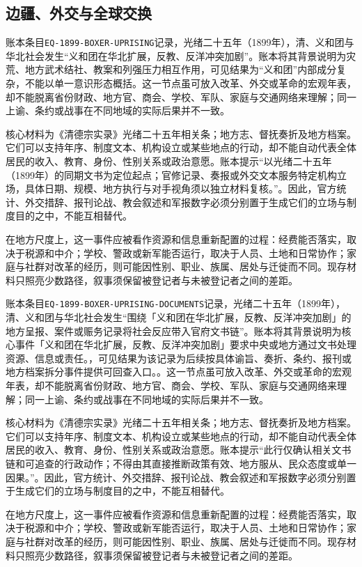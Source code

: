 \subsection{边疆、外交与全球交换}

账本条目\texttt{EQ-1899-BOXER-UPRISING}记录，光绪二十五年（1899年），清、义和团与华北社会发生“义和团在华北扩展，反教、反洋冲突加剧”。账本将其背景说明为灾荒、地方武术结社、教案和列强压力相互作用，可见结果为“义和团”内部成分复杂，不能以单一意识形态概括。这一节点虽可放入改革、外交或革命的宏观年表，却不能脱离省份财政、地方官、商会、学校、军队、家庭与交通网络来理解；同一上谕、条约或战事在不同地域的实际后果并不一致。

核心材料为《清德宗实录》光绪二十五年相关条；地方志、督抚奏折及地方档案。它们可以支持年序、制度文本、机构设立或某些地点的行动，却不能自动代表全体居民的收入、教育、身份、性别关系或政治意愿。账本提示“以光绪二十五年（1899年）的同期文书为定位起点；官修记录、奏报或外交文本服务特定机构立场，具体日期、规模、地方执行与对手视角须以独立材料复核。”。因此，官方统计、外交措辞、报刊论战、教会叙述和军报数字必须分别置于生成它们的立场与制度目的之中，不能互相替代。

在地方尺度上，这一事件应被看作资源和信息重新配置的过程：经费能否落实，取决于税源和中介；学校、警政或新军能否运行，取决于人员、土地和日常协作；家庭与社群对改革的经历，则可能因性别、职业、族属、居处与迁徙而不同。现存材料只照亮少数路径，叙事须保留被登记者与未被登记者之间的差距。

账本条目\texttt{EQ-1899-BOXER-UPRISING-DOCUMENTS}记录，光绪二十五年（1899年），清、义和团与华北社会发生“围绕「义和团在华北扩展，反教、反洋冲突加剧」的地方呈报、案件或赈务记录将社会反应带入官府文书链”。账本将其背景说明为核心事件「义和团在华北扩展，反教、反洋冲突加剧」要求中央或地方通过文书处理资源、信息或责任。，可见结果为该记录为后续按具体谕旨、奏折、条约、报刊或地方档案拆分事件提供可回查入口。。这一节点虽可放入改革、外交或革命的宏观年表，却不能脱离省份财政、地方官、商会、学校、军队、家庭与交通网络来理解；同一上谕、条约或战事在不同地域的实际后果并不一致。

核心材料为《清德宗实录》光绪二十五年相关条；地方志、督抚奏折及地方档案。它们可以支持年序、制度文本、机构设立或某些地点的行动，却不能自动代表全体居民的收入、教育、身份、性别关系或政治意愿。账本提示“此行仅确认相关文书链和可追查的行政动作；不得由其直接推断政策有效、地方服从、民众态度或单一因果。”。因此，官方统计、外交措辞、报刊论战、教会叙述和军报数字必须分别置于生成它们的立场与制度目的之中，不能互相替代。

在地方尺度上，这一事件应被看作资源和信息重新配置的过程：经费能否落实，取决于税源和中介；学校、警政或新军能否运行，取决于人员、土地和日常协作；家庭与社群对改革的经历，则可能因性别、职业、族属、居处与迁徙而不同。现存材料只照亮少数路径，叙事须保留被登记者与未被登记者之间的差距。

